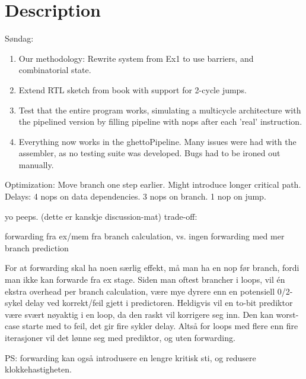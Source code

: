 \section{Description}

Søndag:

\begin{enumerate}
  \item Our methodology: Rewrite system from Ex1 to use barriers, and combinatorial state.
  \item Extend RTL sketch from book with support for 2-cycle jumps.
  \item Test that the entire program works, simulating a multicycle architecture with the pipelined version by filling pipeline with nops after each 'real' instruction.
  \item Everything now works in the ghettoPipeline. Many issues were had with the assembler, as no testing suite was developed. Bugs had to be ironed out manually.
\end{enumerate}

Optimization: Move branch one step earlier. Might introduce longer critical path.
Delays: 4 nops on data dependencies. 3 nops on branch. 1 nop on jump.


yo peeps. (dette er kanskje discussion-mat)
trade-off:

forwarding fra ex/mem fra branch calculation, vs. ingen forwarding med mer branch prediction

For at forwarding skal ha noen særlig effekt, må man ha en nop før branch, fordi man ikke kan forwarde fra ex stage.
Siden man oftest brancher i loops, vil én ekstra overhead per branch calculation, være mye dyrere enn en potensiell 0/2-sykel delay ved korrekt/feil gjett i predictoren.
Heldigvis vil en to-bit prediktor være svært nøyaktig i en loop, da den raskt vil korrigere seg inn.
Den kan worst-case starte med to feil, det gir fire sykler delay.
Altså for loops med flere enn fire iterasjoner vil det lønne seg med prediktor, og uten forwarding.

PS: forwarding kan også introdusere en lengre kritisk sti, og redusere klokkehastigheten.
